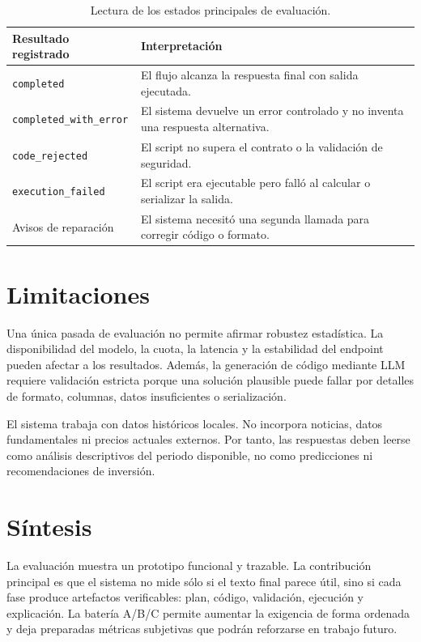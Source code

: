 \begin{table}[H]
\centering
\small
\begin{tabularx}{\textwidth}{p{}X}
\toprule
\textbf{Resultado registrado} & \textbf{Interpretación} \\
\midrule
\texttt{completed} & El flujo alcanza la respuesta final con salida ejecutada. \\
\texttt{completed\_with\_error} & El sistema devuelve un error controlado y no inventa una respuesta alternativa. \\
\texttt{code\_rejected} & El script no supera el contrato o la validación de seguridad. \\
\texttt{execution\_failed} & El script era ejecutable pero falló al calcular o serializar la salida. \\
Avisos de reparación & El sistema necesitó una segunda llamada para corregir código o formato. \\
\bottomrule
\end{tabularx}
\caption{Lectura de los estados principales de evaluación.}
\label{tab:lectura_estados_evaluacion}
\end{table}

\section{Limitaciones}

Una única pasada de evaluación no permite afirmar robustez estadística. La disponibilidad del modelo, la cuota, la latencia y la estabilidad del endpoint pueden afectar a los resultados. Además, la generación de código mediante LLM requiere validación estricta porque una solución plausible puede fallar por detalles de formato, columnas, datos insuficientes o serialización.

El sistema trabaja con datos históricos locales. No incorpora noticias, datos fundamentales ni precios actuales externos. Por tanto, las respuestas deben leerse como análisis descriptivos del periodo disponible, no como predicciones ni recomendaciones de inversión.

\section{Síntesis}

La evaluación muestra un prototipo funcional y trazable. La contribución principal es que el sistema no mide sólo si el texto final parece útil, sino si cada fase produce artefactos verificables: plan, código, validación, ejecución y explicación. La batería A/B/C permite aumentar la exigencia de forma ordenada y deja preparadas métricas subjetivas que podrán reforzarse en trabajo futuro.
